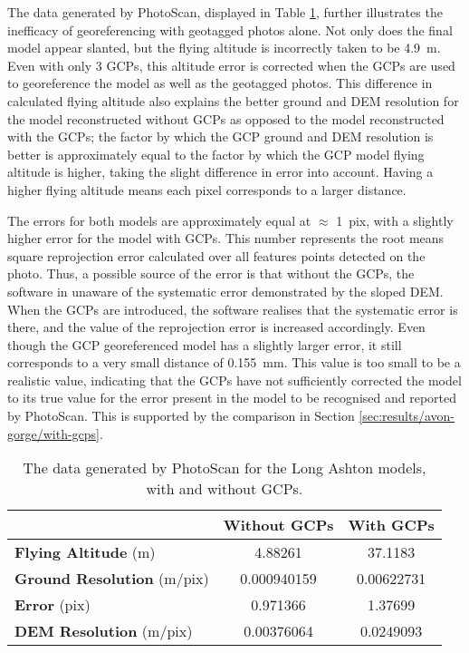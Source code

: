 The data generated by PhotoScan, displayed in Table \ref{tab:long-ashton},
further illustrates the inefficacy of georeferencing with geotagged photos
alone. Not only does the final model appear slanted, but the flying altitude is
incorrectly taken to be \SI{4.9}{m}. Even with only 3 GCPs, this altitude error
is corrected when the GCPs are used to georeference the model as well as the
geotagged photos. This difference in calculated flying altitude also explains
the better ground and DEM resolution for the model reconstructed without GCPs as
opposed to the model reconstructed with the GCPs; the factor by which the GCP
ground and DEM resolution is better is approximately equal to the factor by
which the GCP model flying altitude is higher, taking the slight difference in
error into account. Having a higher flying altitude means each pixel corresponds
to a larger distance.

The errors for both models are approximately equal at $\approx$ \SI{1}{pix},
with a slightly higher error for the model with GCPs. This number
represents the root means square reprojection error calculated over all features
points detected on the photo. Thus, a possible source of the error is that
without the GCPs, the software in unaware of the systematic error demonstrated
by the sloped DEM. When the GCPs are introduced, the software realises that the
systematic error is there, and the value of the reprojection error is increased
accordingly. Even though the GCP georeferenced model has a slightly larger
error, it still corresponds to a very small distance of \SI{0.155}{mm}. This
value is too small to be a realistic value, indicating that the GCPs have not
sufficiently corrected the model to its true value for the error present in the
model to be recognised and reported by PhotoScan. This is supported by the
comparison in Section \ref{sec:results/avon-gorge/with-gcps}.

\begin{table}
    \begin{tabularx}{\textwidth}{| X | c | c |}
        \hline
        & \textbf{Without GCPs} & \textbf{With GCPs} \\
        \hline
        \textbf{Flying Altitude} (m)       & 4.88261     & 37.1183    \\
        \textbf{Ground Resolution} (m/pix) & 0.000940159 & 0.00622731 \\
        \textbf{Error} (pix)               & 0.971366    & 1.37699    \\
        \textbf{DEM Resolution} (m/pix)    & 0.00376064  & 0.0249093  \\
        \hline
    \end{tabularx}
    \caption{The data generated by PhotoScan for the Long Ashton models, with
    and without GCPs.}
    \label{tab:long-ashton}
\end{table}

